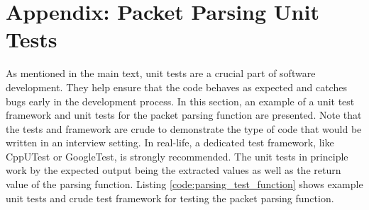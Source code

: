 \documentclass[main.tex]{subfiles}
\begin{document}
\section{Appendix: Packet Parsing Unit Tests} \label{appendix:packet_parsing_tests}
As mentioned in the main text, unit tests are a crucial part of software development. They help ensure that the code behaves as expected and catches bugs early in the development process. In this section, an example of a unit test framework and unit tests for the packet parsing function are presented. Note that the tests and framework are crude to demonstrate the type of code that would be written in an interview setting. In real-life, a dedicated test framework, like CppUTest or GoogleTest, is strongly recommended.
\newline
\newnoindentpara The unit tests in principle work by  the expected output being the extracted values as well as the return value of the parsing function. Listing \ref{code:parsing_test_function} shows example unit tests and crude test framework for testing the packet parsing function.


\end{document}

